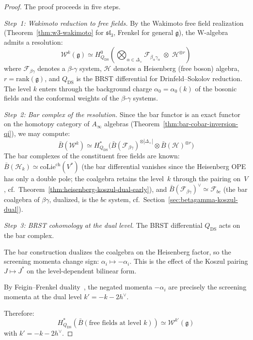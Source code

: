 \begin{proof}
The proof proceeds in five steps.

\emph{Step~1: Wakimoto reduction to free fields.}
By the Wakimoto free field realization (Theorem~\ref{thm:w3-wakimoto} for $\mathfrak{sl}_3$, Frenkel \cite{Feigin-Frenkel} for general $\mathfrak{g}$), the W-algebra admits a resolution:
\[
\mathcal{W}^k(\mathfrak{g}) \simeq H^0_{Q_{\mathrm{DS}}}\!\left(\bigotimes_{\alpha \in \Delta_+} \mathcal{F}_{\beta_\alpha\gamma_\alpha} \;\otimes\; \mathcal{H}^{\otimes r}\right)
\]
where $\mathcal{F}_{\beta\gamma}$ denotes a $\beta$-$\gamma$ system, $\mathcal{H}$ denotes a Heisenberg (free boson) algebra, $r = \mathrm{rank}(\mathfrak{g})$, and $Q_{\mathrm{DS}}$ is the BRST differential for Drinfeld--Sokolov reduction.  The level $k$ enters through the background charge $\alpha_0 = \alpha_0(k)$ of the bosonic fields and the conformal weights of the $\beta$-$\gamma$ systems.

\emph{Step~2: Bar complex of the resolution.}
Since the bar functor is an exact functor on the homotopy category of $A_\infty$ algebras (Theorem~\ref{thm:bar-cobar-inversion-qi}), we may compute:
\[
\bar{B}(\mathcal{W}^k) \simeq H^*_{Q_{\mathrm{DS}}}\!\bigl(\bar{B}(\mathcal{F}_{\beta\gamma})^{\otimes |\Delta_+|} \otimes \bar{B}(\mathcal{H})^{\otimes r}\bigr)
\]
The bar complexes of the constituent free fields are known: $\bar{B}(\mathcal{H}_k) \simeq \mathrm{coLie}^{\mathrm{ch}}(V^*)$ (the bar differential vanishes since the Heisenberg OPE has only a double pole; the coalgebra retains the level~$k$ through the pairing on~$V$, cf.\ Theorem~\ref{thm:heisenberg-koszul-dual-early}), and $\bar{B}(\mathcal{F}_{\beta\gamma})^\vee \simeq \mathcal{F}_{bc}$ (the bar coalgebra of $\beta\gamma$, dualized, is the $bc$ system, cf.\ Section~\ref{sec:betagamma-koszul-dual}).

\emph{Step~3: BRST cohomology at the dual level.}
The BRST differential $Q_{\mathrm{DS}}$ acts on the bar complex.

The bar construction dualizes the coalgebra on the Heisenberg factor,
so the screening momenta change sign:
$\alpha_i \mapsto -\alpha_i$.
This is the effect of the Koszul pairing
$J \mapsto J^*$ on the level-dependent bilinear form.

By Feigin--Frenkel duality~\cite{Feigin-Frenkel}, the negated momenta
$-\alpha_i$ are precisely the screening momenta at the dual level
$k' = -k - 2h^\vee$.

Therefore:
\[
H^*_{Q_{\mathrm{DS}}}(\bar{B}(\text{free fields at level } k)) \simeq \mathcal{W}^{k'}(\mathfrak{g})
\]
with $k' = -k - 2h^\vee$.


\end{proof}
